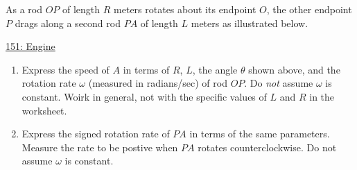 \documentclass{ximera}
\begin{document}
\begin{question}  \label{Q34fdffffhggg}
As a rod $OP$ of length $R$ meters rotates about its endpoint $O$, the other endpoint $P$ drags along a second rod $PA$ of length $L$ meters as illustrated below.

 
\begin{onlineOnly}
   \begin{center}
\end{center}
\end{onlineOnly}

\href{https://www.desmos.com/calculator/l03dlyifb0}{151: Engine}

\begin{enumerate}
\item Express the speed of $A$ in terms of $R$, $L$, the angle $\theta$ shown above, and the rotation rate $\omega$ (measured in radians/sec) of rod $OP$. Do \emph{not} assume $\omega$ is constant. Woirk in general, not with the specific values of $L$ and $R$ in the worksheet.

\item Express the signed rotation rate of $PA$ in terms of the same parameters. Measure the rate to be postive when $PA$ rotates counterclockwise. Do not assume $\omega$ is constant.
\end{enumerate}

\end{question}
\end{document}
